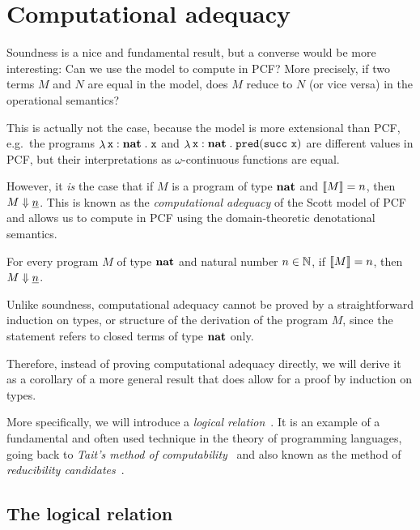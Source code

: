 \chapter{Computational adequacy}\label{chap:comp-adequacy}

Soundness is a nice and fundamental result, but a converse would be more
interesting: Can we use the model to compute in PCF? More precisely, if two
terms \(M\) and \(N\) are equal in the model, does \(M\) reduce to \(N\) (or
vice versa) in the operational semantics?

This is actually not the case, because the model is more extensional than PCF,
e.g.\ the programs \(\mathop{\lambda}{\mathtt x : \mathtt{\mathbf{nat}}}\mathrel{.}\mathtt x\) and
\(\lambdadot{\var x : \pcfnat}{\pcfpred\pa*{\pcfsuc\,\var x}}\) are different
values in PCF, but their interpretations as \(\omega\)-continuous functions are
equal.

However, it \emph{is} the case that if \(M\) is a program of type \(\mathtt{\mathbf{nat}}\)
and \(\llbracket M\rrbracket = n\), then \(M \Downarrow \underline{n}\).
%
This is known as the \emph{computational adequacy} of the Scott model of PCF and
allows us to compute in PCF using the domain-theoretic denotational semantics.

\begin{theorem*}\label{adequacy}
  For every program \(M\) of type \(\mathtt{\mathbf{nat}}\) and natural number \(n \in \mathbb N\),
  if \(\llbracket M\rrbracket = n\), then \(M \Downarrow \underline{n}\).
\end{theorem*}

Unlike soundness, computational adequacy cannot be proved by a straightforward
induction on types, or structure of the derivation of the program \(M\), since
the statement refers to closed terms of type \(\mathtt{\mathbf{nat}}\) only.

Therefore, instead of proving computational adequacy directly, we will derive it
as a corollary of a more general result that does allow for a proof by
induction on types.

More specifically, we will introduce a \emph{logical
  relation}~\cite{Plotkin1973}. It is an example of a fundamental and often used
technique in the theory of programming languages, going back to \emph{Tait's
  method of computability}~\cite{Tait1967} and also known as the method of
\emph{reducibility candidates}~\cite{Girard1989}.

\section{The logical relation}

